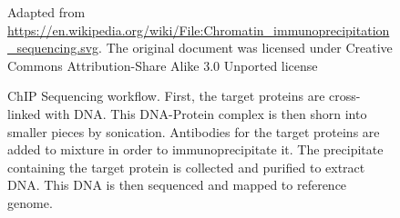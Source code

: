 \documentclass[parskip]{cs4rep}
\begin{document}
\begin{figure}
\centering
{}
{Adapted from \url{https://en.wikipedia.org/wiki/File:Chromatin_immunoprecipitation_sequencing.svg}.
The original document was licensed under Creative Commons Attribution-Share Alike 3.0 Unported license}
\caption{ChIP Sequencing workflow. First, the target proteins are cross-linked with DNA. This DNA-Protein complex is then shorn into smaller pieces by sonication. Antibodies for the target proteins are added to mixture in order to immunoprecipitate it. The precipitate containing the target protein is collected and purified to extract DNA. This DNA is then sequenced and mapped to reference genome.
}
\label{fig:background:chip}
\end{figure}
\end{document}

